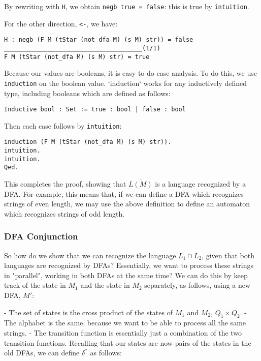 By rewriting with \texttt{H}, we obtain \texttt{negb true = false}: this is true by \texttt{intuition}.

For the other direction, \texttt{<-}, we have:

\begin{verbatim}
H : negb (F M (tStar (not_dfa M) (s M) str)) = false
______________________________________(1/1)
F M (tStar (not_dfa M) (s M) str) = true
\end{verbatim}

Because our values are booleans, it is easy to do case analysis.
To do this, we use \texttt{induction} on the boolean value.
`induction` works for any inductively defined type, including booleans which are defined as follows:

\begin{verbatim}
Inductive bool : Set := true : bool | false : bool
\end{verbatim}

Then each case follows by \texttt{intuition}:

\begin{verbatim}
induction (F M (tStar (not_dfa M) (s M) str)).
intuition.
intuition.
Qed.
\end{verbatim}

This completes the proof, showing that $\overline{L(M)}$ is a language recognized by a DFA.
For example, this means that, if we can define a DFA which recognizes strings of even length, we may use the above definition to define an automaton which recognizes strings of odd length.

\subsubsection{DFA Conjunction}

So how do we show that we can recognize the language $L_1 \cap L_2$, given that both languages are recognized by DFAs?
Essentially, we want to process these strings in "parallel", working in both DFAs at the same time?
We can do this by keep track of the state in $M_1$ and the state in $M_2$ separately, as follows, using a new DFA, $M'$:

- The set of states is the cross product of the states of $M_1$ and $M_2$, $Q_1 \times Q_2$.
- The alphabet is the same, because we want to be able to process all the same strings.
- The transition function is essentially just a combination of the two transition functions. Recalling that our states are now pairs of the states in the old DFAs, we can define $\delta^*$ as follows:

